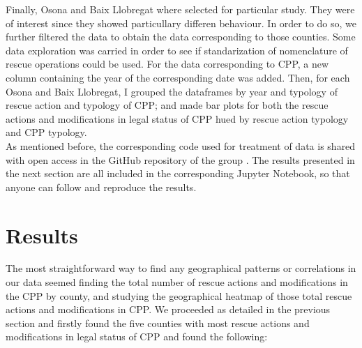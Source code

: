 \documentclass[
  journal=small,
  manuscript=mini-article,  %
  year=2023,
  volume=1,
]{odj-journal}
\begin{document}
Finally, Osona and Baix Llobregat where selected for particular study. They were of interest since they showed particullary differen behaviour. In order to do so, we further filtered the data to obtain the data corresponding to those counties. Some data exploration was carried in order to see if standarization of nomenclature of rescue operations could be used. For the data corresponding to CPP, a new column containing the year of the corresponding date was added. Then, for each Osona and Baix Llobregat, I grouped the dataframes by year and typology of rescue action and typology of CPP; and made bar plots for both the rescue actions and modifications in legal status of CPP hued by rescue action typology and CPP typology.\\

As mentioned before, the corresponding code used for treatment of data is shared with open access in the GitHub repository of the group \cite{github_repo}. The results presented in the next section are all included in the corresponding Jupyter Notebook, so that anyone can follow and reproduce the results.

\section{Results}
The most straightforward way to find any geographical patterns or correlations in our data seemed finding the total number of rescue actions and modifications in the CPP by county, and studying the geographical heatmap of those total rescue actions and modifications in CPP. We proceeded as detailed in the previous section and firstly found the five counties with most rescue actions and modifications in legal status of CPP and found the following:
\end{document}
